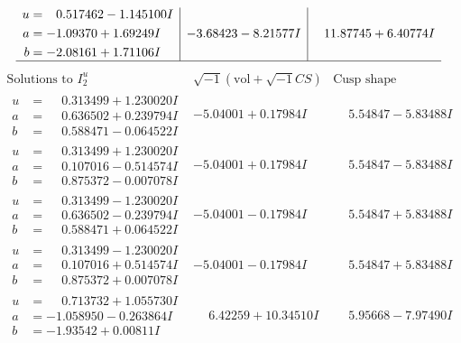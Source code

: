 \documentclass[1p]{elsarticle_modified}
\theoremstyle{definition}
\newcommand{\I}{\sqrt{-1}}
\begin{document}
$$\begin{array}{c|c|c}
\begin{aligned}
u &= \phantom{-}0.517462 - 1.145100 I \\
a &= -1.09370 + 1.69249 I \\
b &= -2.08161 + 1.71106 I\end{aligned}
 & -3.68423 - 8.21577 I & \phantom{-}11.87745 + 6.40774 I\\
 \hline 
 \end{array}$$\newpage$$\begin{array}{c|c|c}  
\text{Solutions to }I^u_{2}& \I (\text{vol} + \sqrt{-1}CS) & \text{Cusp shape}\\
 \hline 
\begin{aligned}
u &= \phantom{-}0.313499 + 1.230020 I \\
a &= \phantom{-}0.636502 + 0.239794 I \\
b &= \phantom{-}0.588471 - 0.064522 I\end{aligned}
 & -5.04001 + 0.17984 I & \phantom{-}5.54847 - 5.83488 I \\ \hline\begin{aligned}
u &= \phantom{-}0.313499 + 1.230020 I \\
a &= \phantom{-}0.107016 - 0.514574 I \\
b &= \phantom{-}0.875372 - 0.007078 I\end{aligned}
 & -5.04001 + 0.17984 I & \phantom{-}5.54847 - 5.83488 I \\ \hline\begin{aligned}
u &= \phantom{-}0.313499 - 1.230020 I \\
a &= \phantom{-}0.636502 - 0.239794 I \\
b &= \phantom{-}0.588471 + 0.064522 I\end{aligned}
 & -5.04001 - 0.17984 I & \phantom{-}5.54847 + 5.83488 I \\ \hline\begin{aligned}
u &= \phantom{-}0.313499 - 1.230020 I \\
a &= \phantom{-}0.107016 + 0.514574 I \\
b &= \phantom{-}0.875372 + 0.007078 I\end{aligned}
 & -5.04001 - 0.17984 I & \phantom{-}5.54847 + 5.83488 I \\ \hline\begin{aligned}
u &= \phantom{-}0.713732 + 1.055730 I \\
a &= -1.058950 - 0.263864 I \\
b &= -1.93542 + 0.00811 I\end{aligned}
 & \phantom{-}6.42259 + 10.34510 I & \phantom{-}5.95668 - 7.97490 I \\ \hline\begin{aligned}

\end{aligned}
\end{array}$$
\end{document}
